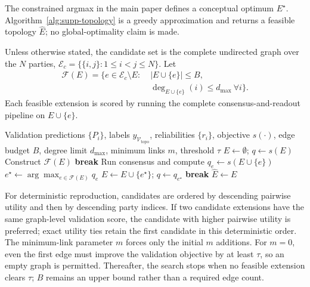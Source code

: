 \documentclass[letterpaper]{article}
\newcommand{\Ec}{\mathcal{E}_c}
\begin{document}
The constrained argmax in the main paper defines a conceptual optimum
$E^\star$. Algorithm~\ref{alg:supp-topology} is a greedy approximation and
returns a feasible topology $\widehat E$; no global-optimality claim is made.

Unless otherwise stated, the candidate set is the complete undirected graph over
the $N$ parties,
$\Ec=\{\{i,j\}:1\le i<j\le N\}$.
Let
\begin{equation}
\begin{aligned}
\mathcal{F}(E)=\bigl\{e\in\Ec\setminus E:\;&
|E\cup\{e\}|\le B,\;\\
&\deg_{E\cup\{e\}}(i)\le d_{\max}\ \forall i
\bigr\}.
\end{aligned}
\end{equation}
Each feasible extension is scored by running the complete consensus-and-readout
pipeline on $E\cup\{e\}$.

\begin{algorithm}[t]
\caption{Validation-Assisted Sparse Topology Learning}
\label{alg:supp-topology}
\begin{algorithmic}[1]
\REQUIRE Validation predictions $\{P_i\}$, labels
$y_{\mathcal{V}_{\mathrm{topo}}}$, reliabilities $\{r_i\}$,
objective $s(\cdot)$, edge budget $B$, degree limit $d_{\max}$,
minimum links $m$, threshold $\tau$
\STATE $E\leftarrow\emptyset$; $q\leftarrow s(E)$
\STATE Construct $\mathcal{F}(E)$
\STATE \textbf{break}
\ENDIF
{}
\STATE Run consensus and compute $q_e\leftarrow s(E\cup\{e\})$
\ENDFOR
\STATE $e^\star\leftarrow\arg\max_{e\in\mathcal{F}(E)} q_e$
\STATE $E\leftarrow E\cup\{e^\star\}$; $q\leftarrow q_{e^\star}$
\ELSE
\STATE \textbf{break}
\ENDIF
\ENDWHILE
\RETURN $\widehat E\leftarrow E$
\end{algorithmic}
\end{algorithm}

For deterministic reproduction, candidates are ordered by descending pairwise
utility and then by descending party indices. If two candidate extensions have
the same graph-level validation score, the candidate with higher pairwise
utility is preferred; exact utility ties retain the first candidate in this
deterministic order. The minimum-link parameter $m$ forces only the initial
$m$ additions. For $m=0$, even the first edge must improve the validation
objective by at least $\tau$, so an empty graph is permitted. Thereafter, the
search stops when no feasible extension clears $\tau$; $B$ remains an upper
bound rather than a required edge count.
\end{document}
